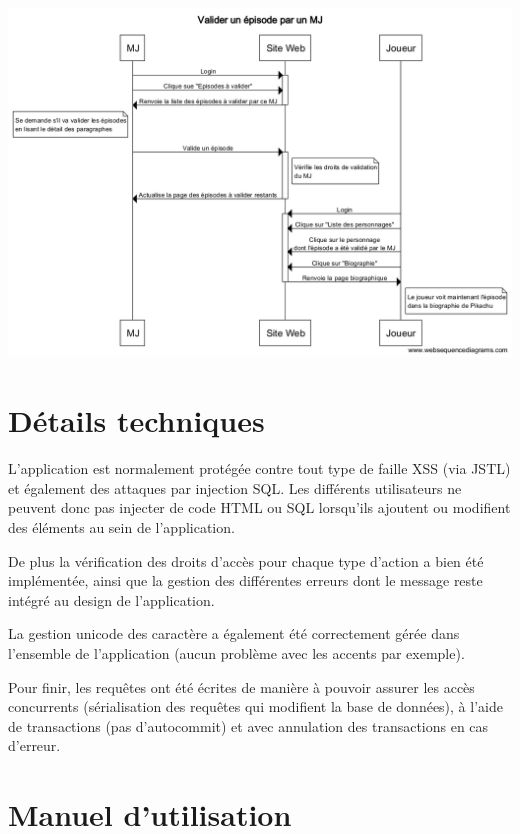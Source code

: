 \documentclass[a4paper, 11pt, titlepage]{article}
\begin{document}
\begin{center}
\includegraphics[scale=0.45]{sequence/ValiderEpisodeParMJ.png}
\end{center}


\section {Détails techniques}

L'application est normalement protégée contre tout type de faille XSS (via JSTL) et également des attaques par injection SQL. Les différents utilisateurs ne peuvent donc pas injecter de code HTML ou SQL lorsqu'ils ajoutent ou modifient des éléments au sein de l'application.

De plus la vérification des droits d'accès pour chaque type d'action a bien été implémentée, ainsi que la gestion des différentes erreurs dont le message reste intégré au design de l'application.

La gestion unicode des caractère a également été correctement gérée dans l'ensemble de l'application (aucun problème avec les accents par exemple).

Pour finir, les requêtes ont été écrites de manière à pouvoir assurer les accès concurrents (sérialisation des requêtes qui modifient la base de données), à l'aide de transactions (pas d'autocommit) et avec annulation des transactions en cas d'erreur.



\section {Manuel d'utilisation}
\end{document}
